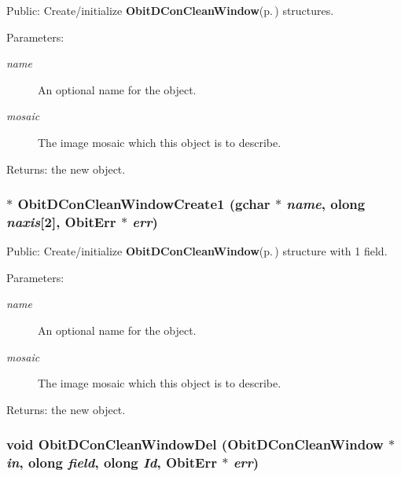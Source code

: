 Public: Create/initialize {\bf Obit\-DCon\-Clean\-Window}{\rm (p.\,\pageref{structObitDConCleanWindow})} structures. 

\begin{Desc}
\item[Parameters:]
\begin{description}
\item[{\em name}]An optional name for the object. \item[{\em mosaic}]The image mosaic which this object is to describe. \end{description}
\end{Desc}
\begin{Desc}
\item[Returns:]the new object. \end{Desc}
\subsubsection{$\ast$ Obit\-DCon\-Clean\-Window\-Create1 (gchar $\ast$ {\em name}, {\bf olong} {\em naxis}[2], {\bf Obit\-Err} $\ast$ {\em err})}\label{ObitDConCleanWindow_8c_a16}


Public: Create/initialize {\bf Obit\-DCon\-Clean\-Window}{\rm (p.\,\pageref{structObitDConCleanWindow})} structure with 1 field. 

\begin{Desc}
\item[Parameters:]
\begin{description}
\item[{\em name}]An optional name for the object. \item[{\em mosaic}]The image mosaic which this object is to describe. \end{description}
\end{Desc}
\begin{Desc}
\item[Returns:]the new object. \end{Desc}
\subsubsection{\setlength{\rightskip}{0pt plus 5cm}void Obit\-DCon\-Clean\-Window\-Del ({\bf Obit\-DCon\-Clean\-Window} $\ast$ {\em in}, {\bf olong} {\em field}, {\bf olong} {\em Id}, {\bf Obit\-Err} $\ast$ {\em err})}\label{ObitDConCleanWindow_8c_a20}


